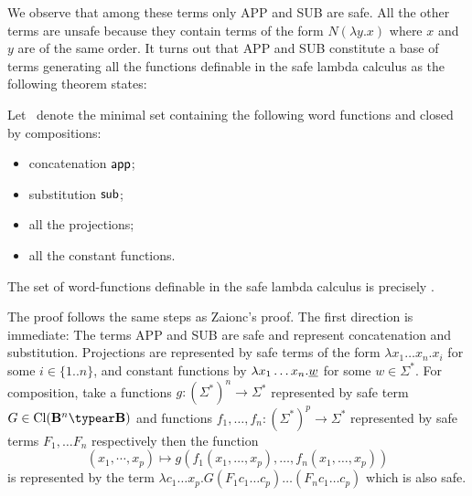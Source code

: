 We observe that among these terms only {\rm APP} and {\rm SUB} are
safe. All the other terms are unsafe because they contain terms of
the form $ N (\lambda y .x)$ where $x$ and $y$ are of the same
order. It turns out that {\rm APP} and {\rm SUB} constitute a base
of terms generating all the functions definable in the safe lambda
calculus as the following theorem states:
\begin{theorem}
\label{thm:wordfunctions_safely_definable}
Let \safedefset\ denote the minimal set containing the following word functions and closed by compositions:
\begin{itemize}
  \item concatenation ${\sf app}$;
  \item substitution ${\sf sub}$;
  \item all the projections;
  \item all the constant functions.
\end{itemize}
The set of word-functions definable in the safe lambda calculus is
precisely \safedefset.
\end{theorem}

The proof follows the same steps as Zaionc's proof. The first
direction is immediate: The terms {\rm APP} and {\rm SUB} are safe
and represent concatenation and substitution. Projections are
represented by safe terms of the form $\lambda x_1 \ldots x_n . x_i$
for some $i\in\{1..n\}$, and constant functions by $\lambda x_1
\ldots x_n . \underline{w}$ for some $w\in\Sigma^*$. For
composition, take a functions $g:(\Sigma^*)^n \rightarrow \Sigma^*$
represented by safe term $G\in \closedof{\zaiwordtyp^n \typear
\zaiwordtyp}$ and functions $f_1,\ldots,f_n : (\Sigma^*)^p
\rightarrow \Sigma^*$ represented by safe terms $F_1,\ldots F_n$
respectively then the function $$(x_1,\cdots,x_p) \mapsto
g(f_1(x_1,\ldots,x_p),\ldots,f_n(x_1,\ldots,x_p))$$ is represented
by the term $\lambda c_1\ldots x_p. G (F_1 c_1 \ldots c_p)\ldots
(F_n c_1 \ldots c_p)$ which is also safe.
\bigskip

